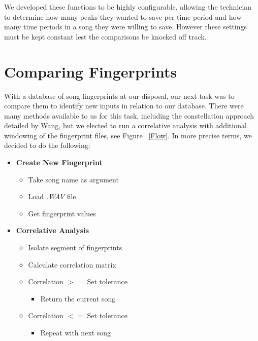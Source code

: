 We developed these functions to be highly configurable, allowing the technician to determine how many peaks they wanted to save per time period and how many time periods in a song they were willing to save. However these settings must be kept constant lest the comparisons be knocked off track.


\section{Comparing Fingerprints}

With a database of song fingerprints at our disposal, our next task was to compare them to identify new inputs in relation to our database. There were many methods available to us for this task, including the constellation approach detailed by Wang, but we elected to run a correlative analysis with additional windowing of the fingerprint files, see Figure ~\ref{Flow}. In more precise terms, we decided to do the following:

\begin{itemize}[leftmargin = 0.5cm, noitemsep]
	\item \textbf{Create New Fingerprint}
	\begin{itemize}[leftmargin = 1cm, noitemsep]
		\item Take song name as argument
		\item Load \textit{.WAV} file
		\item Get fingerprint values
	\end{itemize}
	\item \textbf{Correlative Analysis}
	\begin{itemize}[leftmargin = 1cm, noitemsep]
		\item Isolate segment of fingerprints
		\item Calculate correlation matrix
		\item Correlation $>=$ Set tolerance
		\begin{itemize}[leftmargin = 1cm, noitemsep]
			\item Return the current song
		\end{itemize}
		\item Correlation $<=$ Set tolerance
		\begin{itemize}[leftmargin = 1cm, noitemsep]
			\item Repeat with next song
		\end{itemize}
	\end{itemize}
\end{itemize}

